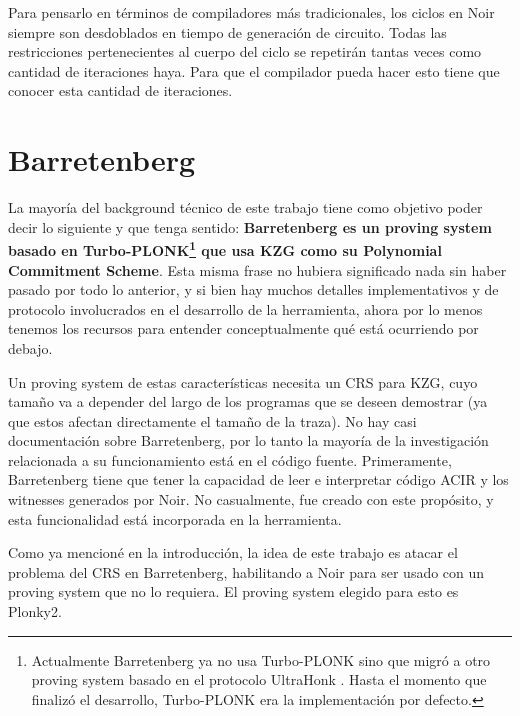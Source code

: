 Para pensarlo en términos de compiladores más tradicionales, los ciclos en Noir siempre son desdoblados en tiempo de generación de circuito. Todas las restricciones pertenecientes al cuerpo del ciclo se repetirán tantas veces como cantidad de iteraciones haya. Para que el compilador pueda hacer esto tiene que conocer esta cantidad de iteraciones.


\section{Barretenberg}
La mayoría del background técnico de este trabajo tiene como objetivo poder decir lo siguiente y que tenga sentido: \textbf{Barretenberg es un proving system basado en Turbo-PLONK\footnote{Actualmente Barretenberg ya no usa Turbo-PLONK sino que migró a otro proving system basado en el protocolo UltraHonk \cite{UltraHonk}. Hasta el momento que finalizó el desarrollo, Turbo-PLONK era la implementación por defecto.} que usa KZG como su Polynomial Commitment Scheme}. Esta misma frase no hubiera significado nada sin haber pasado por todo lo anterior, y si bien hay muchos detalles implementativos y de protocolo involucrados en el desarrollo de la herramienta, ahora por lo menos tenemos los recursos para entender conceptualmente qué está ocurriendo por debajo. 

Un proving system de estas características necesita un CRS para KZG, cuyo tamaño va a depender del largo de los programas que se deseen demostrar (ya que estos afectan directamente el tamaño de la traza). No hay casi documentación sobre Barretenberg, por lo tanto la mayoría de la investigación relacionada a su funcionamiento está en el código fuente. Primeramente, Barretenberg tiene que tener la capacidad de leer e interpretar código ACIR y los witnesses generados por Noir. No casualmente, fue creado con este propósito, y esta funcionalidad está incorporada en la herramienta.

Como ya mencioné en la introducción, la idea de este trabajo es atacar el problema del CRS en Barretenberg, habilitando a Noir para ser usado con un proving system que no lo requiera. El proving system elegido para esto es Plonky2. 